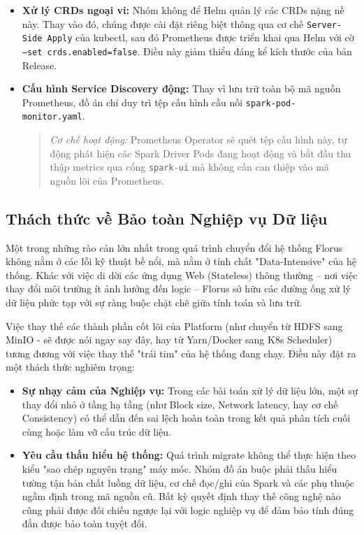 \begin{itemize}
    \item \textbf{Xử lý CRDs ngoại vi:} Nhóm không để Helm quản lý các CRDs nặng nề này. Thay vào đó, chúng được cài đặt riêng biệt thông qua cơ chế \texttt{Server-Side Apply} của kubectl, sau đó Prometheus được triển khai qua Helm với cờ \texttt{--set crds.enabled=false}. Điều này giảm thiểu đáng kể kích thước của bản Release.
    
    \item \textbf{Cấu hình Service Discovery động:} Thay vì lưu trữ toàn bộ mã nguồn Prometheus, đồ án chỉ duy trì tệp cấu hình cầu nối \texttt{spark-pod-monitor.yaml}.
    \begin{quote}
        \textit{Cơ chế hoạt động:} Prometheus Operator sẽ quét tệp cấu hình này, tự động phát hiện các Spark Driver Pods đang hoạt động và bắt đầu thu thập metrics qua cổng \texttt{spark-ui} mà không cần can thiệp vào mã nguồn lõi của Prometheus.
    \end{quote}
\end{itemize}

\subsection{Thách thức về Bảo toàn Nghiệp vụ Dữ liệu}

Một trong những rào cản lớn nhất trong quá trình chuyển đổi hệ thống Florus không nằm ở các lỗi kỹ thuật bề nổi, mà nằm ở tính chất "Data-Intensive" của hệ thống. Khác với việc di dời các ứng dụng Web (Stateless) thông thường – nơi việc thay đổi môi trường ít ảnh hưởng đến logic – Florus sở hữu các đường ống xử lý dữ liệu phức tạp với sự ràng buộc chặt chẽ giữa tính toán và lưu trữ.

Việc thay thế các thành phần cốt lõi của Platform (như chuyển từ HDFS sang MinIO - sẽ được nói ngay say đây, hay từ Yarn/Docker sang K8s Scheduler) tương đương với việc thay thế "trái tim" của hệ thống đang chạy. Điều này đặt ra một thách thức nghiêm trọng:

\begin{itemize} 

    \item \textbf{Sự nhạy cảm của Nghiệp vụ:} Trong các bài toán xử lý dữ liệu lớn, một sự thay đổi nhỏ ở tầng hạ tầng (như Block size, Network latency, hay cơ chế Consistency) có thể dẫn đến sai lệch hoàn toàn trong kết quả phân tích cuối cùng hoặc làm vỡ cấu trúc dữ liệu.

    \item \textbf{Yêu cầu thấu hiểu hệ thống:}
Quá trình migrate không thể thực hiện theo kiểu "sao chép nguyên trạng" máy móc. Nhóm đồ án buộc phải thấu hiểu tường tận bản chất luồng dữ liệu, cơ chế đọc/ghi của Spark và các phụ thuộc ngầm định trong mã nguồn cũ. Bất kỳ quyết định thay thế công nghệ nào cũng phải được đối chiếu ngược lại với logic nghiệp vụ để đảm bảo tính đúng đắn được bảo toàn tuyệt đối.

\end{itemize}

